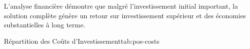 \documentclass{TemplatesParametriques/dollarama}
\begin{document}

\begin{dollaramafinancials}{
    L'analyse financière démontre que malgré l'investissement initial important, la solution complète génère un retour sur investissement supérieur et des économies substantielles à long terme.
}
    
    \begin{dollaramacosttable}{Répartition des Coûts d'Investissement}{tab:pos-costs}
        \hline
    \end{dollaramacosttable}
\end{dollaramafinancials}

\end{document}

